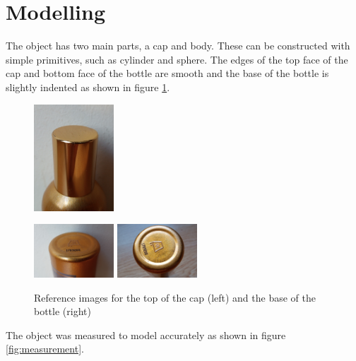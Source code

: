 \section{Modelling}
The object has two main parts, a cap and body. These can be constructed with simple primitives, such as cylinder and sphere. The edges of the top face of the cap and bottom face of the bottle are smooth and the base of the bottle is slightly indented as shown in figure \ref{fig:modelref}.

\begin{figure}[htbp]
    \begin{minipage}[c]{3cm}
    \includegraphics[width=3cm]{imgs/cap_top.jpg}
    \end{minipage}
    \begin{minipage}[c]{3cm}
        \includegraphics[width=3cm]{imgs/bottom.jpg}
        \includegraphics[width=3cm]{imgs/base.jpg}    
    \end{minipage}
    \caption{Reference images for the top of the cap (left) and the base of the bottle (right)}
    \label{fig:modelref}
\end{figure}

The object was measured to model accurately as shown in figure \ref{fig:measurement}.

